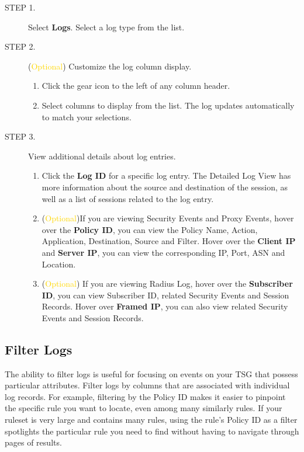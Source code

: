 \begin{description}
    \item[STEP 1.]	Select \textbf{Logs}. Select a log type from the list. 
    \item[STEP 2.]	(\textcolor{gold}{Optional}) Customize the log column display.
    \begin{enumerate} 
        \item Click the gear icon to the left of any column header.
        \item Select columns to display from the list. The log updates automatically to match your selections.
    \end{enumerate}
    \item[STEP 3.]	View additional details about log entries.
    \begin{enumerate}
        \item Click the \textbf{Log ID} for a specific log entry. The Detailed Log View has more information about the source and destination of the session, as well as a list of sessions related to the log entry.
        \item (\textcolor{gold}{Optional})If you are viewing Security Events and Proxy Events, hover over the \textbf{Policy ID}, 
        you can view the Policy Name, Action, Application, Destination, Source and Filter. 
        Hover over the \textbf{Client IP} and \textbf{Server IP}, you can view the corresponding IP, Port, ASN and Location.
        \item (\textcolor{gold}{Optional}) If you are viewing Radius Log, hover over the \textbf{Subscriber ID}, you can view Subscriber ID, related Security Events and Session Records. 
        Hover over \textbf{Framed IP}, you can also view related Security Events and Session Records.
    \end{enumerate}
\end{description}

\subsection*{\hypertarget{link:Filter Logs}{Filter Logs}}
\label{sec:monitor:log:filter}

The ability to filter logs is useful for focusing on events on your TSG that possess particular attributes. 
Filter logs by columns that are associated with individual log records. For example, filtering by the Policy ID makes it easier to pinpoint the specific rule you want to locate, 
even among many similarly rules. If your ruleset is very large and contains many rules, using the rule’s Policy ID 
as a filter spotlights the particular rule you need to find without having to navigate through pages of results. 


